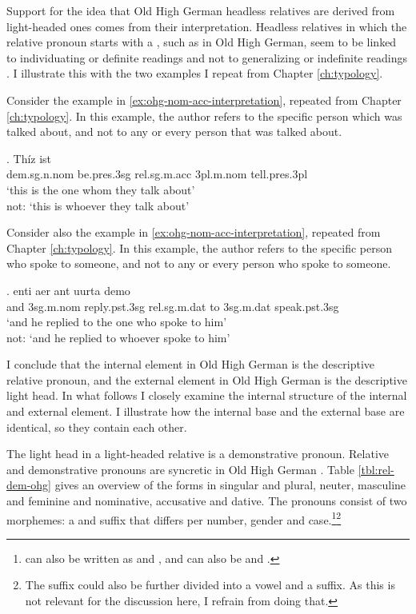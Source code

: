 Support for the idea that Old High German headless relatives are derived from light-headed ones comes from their interpretation. Headless relatives in which the relative pronoun starts with a , such as in Old High German, seem to be linked to individuating or definite readings and not to generalizing or indefinite readings \citep[cf.][]{fuss2017}. I illustrate this with the two examples I repeat from Chapter  \ref{ch:typology}.

Consider the example in \ref{ex:ohg-nom-acc-interpretation}, repeated from Chapter \ref{ch:typology}.
In this example, the author refers to the specific person which was talked about, and not to any or every person that was talked about.

\exg. Thíz ist   \\
\ac{dem}.\ac{sg}.\ac{n}.\ac{nom} be.\ac{pres}.3\ac{sg}\scsub{[nom]} \ac{rel}.\ac{sg}.\ac{m}.\ac{acc}
3\ac{pl}.\ac{m}.\ac{nom} tell.\ac{pres}.3\ac{pl}\scsub{[acc]}\\
`this is the one whom they talk about'\\
not: `this is whoever they talk about' \label{ex:ohg-nom-acc-interpretation}

Consider also the example in \ref{ex:ohg-nom-acc-interpretation}, repeated from Chapter \ref{ch:typology}.
In this example, the author refers to the specific person who spoke to someone, and not to any or every person who spoke to someone.

\exg. enti aer {ant uurta} demo  \\
and 3\ac{sg}.\ac{m}.\ac{nom} reply.\ac{pst}.3\ac{sg}\scsub{[dat]} \ac{rel}.\ac{sg}.\ac{m}.\ac{dat} {to 3\ac{sg}.\ac{m}.\ac{dat}} speak.\ac{pst}.3\ac{sg}\scsub{[nom]}\\
`and he replied to the one who spoke to him'\\
not: `and he replied to whoever spoke to him'
 \label{ex:ohg-dat-nom-rep}

I conclude that the internal element in Old High German is the descriptive relative pronoun, and the external element in Old High German is the descriptive light head. In what follows I closely examine the internal structure of the internal and external element. I illustrate how the internal base and the external base are identical, so they contain each other.

The light head in a light-headed relative is a demonstrative pronoun. Relative and demonstrative pronouns are syncretic in Old High German . Table \ref{tbl:rel-dem-ohg} gives an overview of the forms in singular and plural, neuter, masculine and feminine and nominative, accusative and dative. The pronouns consist of two morphemes: a  and suffix that differs per number, gender and case.\footnote{
 can also be written as  and ,  and  can also be  and  .
}\footnote{
The suffix could also be further divided into a vowel and a suffix. As this is not relevant for the discussion here, I refrain from doing that.
}


